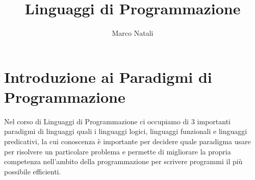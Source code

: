 \documentclass[a4paper]{book}
\begin{document}
\title{Linguaggi di Programmazione}
\author{Marco Natali}
\date{}%
\maketitle

\tableofcontents

\chapter{Introduzione ai Paradigmi di Programmazione}
Nel corso di Linguaggi di Programmazione ci occupiamo di 3 importanti paradigmi di
linguaggi quali i linguaggi logici, linguaggi funzionali e linguaggi predicativi, la cui conoscenza è importante
per decidere quale paradigma usare per risolvere un particolare problema e permette di migliorare la
propria competenza nell'ambito della programmazione per scrivere programmi il più possibile efficienti.
\end{document}
